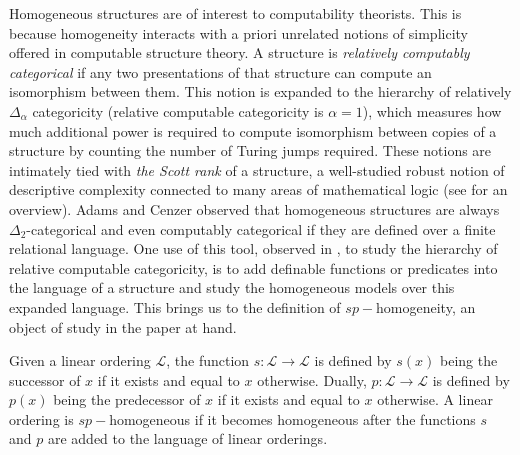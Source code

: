 \documentclass[11pt]{amsart}
\theoremstyle{definition}
\def\L{\mathcal L}
\begin{document}
Homogeneous structures are of interest to computability theorists.
This is because homogeneity interacts with a priori unrelated notions of simplicity offered in computable structure theory.
A structure is \textit{relatively computably categorical} if any two presentations of that structure can compute an isomorphism between them.
This notion is expanded to the hierarchy of relatively $\Delta_\alpha$ categoricity (relative computable categoricity is $\alpha=1$), which measures how much additional power is required to compute isomorphism between copies of a structure by counting the number of Turing jumps required.
These notions are intimately tied with \textit{the Scott rank} of a structure, a well-studied robust notion of descriptive complexity connected to many areas of mathematical logic (see \cite{HT22} for an overview).
Adams and Cenzer \cite{AC17} observed that homogeneous structures are always $\Delta_2$-categorical and even computably categorical if they are defined over a finite relational language.
One use of this tool, observed in \cite{CCGHN}, to study the hierarchy of relative computable categoricity, is to add definable functions or predicates into the language of a structure and study the homogeneous models over this expanded language.
This brings us to the definition of $sp-$homogeneity, an object of study in the paper at hand.

\begin{definition}
    Given a linear ordering $\L$, the function $s:\L\to\L$ is defined by $s(x)$ being the successor of $x$ if it exists and equal to $x$ otherwise.
    Dually, $p:\L\to\L$ is defined by $p(x)$ being the predecessor of $x$ if it exists and equal to $x$ otherwise.
    A linear ordering is $sp-$homogeneous if it becomes homogeneous after the functions $s$ and $p$ are added to the language of linear orderings.
\end{definition}
\end{document}
